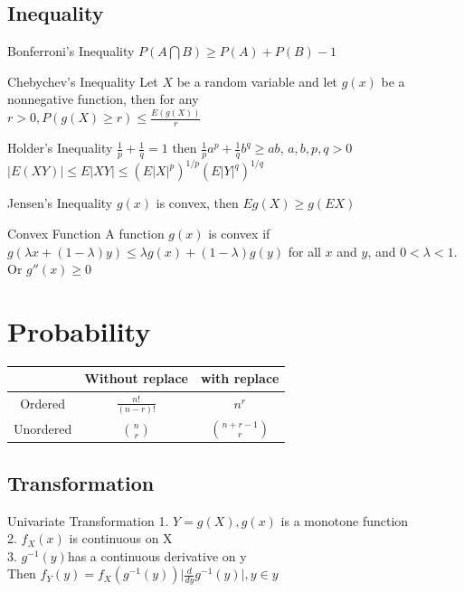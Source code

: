 \documentclass{article}
\begin{document}
\begin{multicols*}{3}
\subsection{Inequality}

\begin{thmbox}{Bonferroni's Inequality}
$P(A \bigcap B) \ge P(A) + P(B) - 1 $
\end{thmbox}

\begin{thmbox}{Chebychev's Inequality}
Let $X$ be a random variable and let $g(x)$ be a nonnegative function, then for any \\
$r > 0, P(g(X)\ge r) \le \frac{E(g(X))}{r}$
\end{thmbox}

\begin{thmbox}{Holder's Inequality}
$\frac{1}{p} + \frac{1}{q} = 1$ then
$\frac{1}{p}a^p +\frac{1}{q}b^q \ge ab$, $a,b,p,q > 0$ \\
$\lvert E(XY) \rvert \le E\lvert XY \rvert \le (E\lvert X\rvert ^p)^{1/p}(E\lvert  Y\rvert ^q)^{1/q}$
\end{thmbox}

\begin{thmbox}{Jensen's Inequality }
 $g(x)$ is convex, then 
$Eg(X) \ge g(EX)$
\end{thmbox}

\begin{thmbox}{Convex Function}
A function $g(x)$ is convex if $g(\lambda x + (1 - \lambda)y) \le \lambda g(x) + (1 - \lambda)g(y)$ for all $x$ and $y$, and $0 < \lambda < 1$. \\
Or $g''(x) \ge 0$
\end{thmbox}

\section{Probability}
\begin{tabular}{ccc}
\toprule  
 & Without replace & with replace \\
\midrule
Ordered & $\frac{n!}{(n-r)!}$ & $n^r$ \\
Unordered & ${n \choose r} $ & $ {n+r-1 \choose r}$\\
\bottomrule
\end{tabular}


\subsection{Transformation}
\begin{thmbox}{Univariate Transformation}
1. $Y = g(X), g(x)$ is a monotone function \\
2. $f_X(x)$ is continuous on X \\
3. $g^{-1}(y)$has a continuous derivative on y \\
Then $f_Y(y) = f_X(g^{-1}(y))\lvert \frac{d}{dy}g^{-1}(y)\rvert, y \in y$
\end{thmbox}


\end{multicols*}
\end{document}
